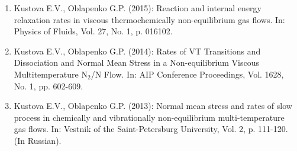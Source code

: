 \documentclass{resume} %
\begin{document}
\begin{enumerate}
\item {Kustova E.V., {Oblapenko G.P.}} (2015): Reaction and internal energy relaxation rates in viscous thermochemically non-equilibrium gas flows. In: Physics of Fluids, Vol. 27, No. 1, p. 016102.

\item  {Kustova E.V., {Oblapenko G.P.}} (2014): Rates of VT Transitions and Dissociation and Normal Mean Stress in a Non-equilibrium Viscous Multitemperature N$_2$/N Flow. In: AIP Conference Proceedings, Vol. 1628, No. 1, pp. 602-609.

\item  {Kustova E.V., {Oblapenko G.P.}} (2013):
{Normal mean stress and rates of slow process in chemically and vibrationally non-equilibrium multi-temperature gas flows.} In: Vestnik of the Saint-Petersburg University, Vol. 2, p. 111-120. (In Russian).
\end{enumerate}
\end{document}
